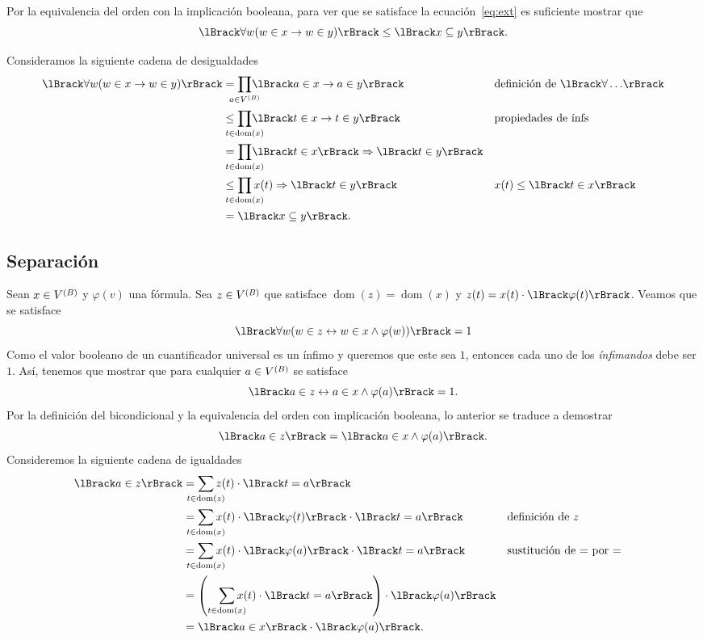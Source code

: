 \documentclass[letterpaper,DIV=15,12pt]{scrartcl}
\theoremstyle{manual}
\DeclarePairedDelimiter{\vb}{\lBrack}{\rBrack}             %
\DeclareMathOperator{\dom}{dom}                            %
\begin{document}
Por la equivalencia del orden con la implicación booleana, para ver que se
satisface la ecuación~\ref{eq:ext} es suficiente mostrar que
\begin{equation}
  \vb{\forall w(w\in x\to w\in y)}\leq\vb{x\subseteq y}.
\end{equation}

Consideramos la siguiente cadena de desigualdades
\begin{align*}
  \vb{\forall w(w\in x\to w\in y)} 
  &= \smashoperator{\prod_{a\in\mb}}\vb{a\in x\to a\in y}
  && \text{definición de \(\vb{\forall\dots}\)}\\
  &\leq \smashoperator{\prod_{t\in\dom(x)}}\vb{t\in x\to t\in y}
  && \text{propiedades de ínfs}\\
  &= \smashoperator{\prod_{t\in\dom(x)}}\vb{t\in x}\Rightarrow \vb{t\in y}\\
  &\leq \smashoperator{\prod_{t\in\dom(x)}}x(t)\Rightarrow\vb{t\in y}
  && x(t)\leq\vb{t\in x}\\
  &= \vb{x\subseteq y}.
\end{align*}


\subsection{Separación}
Sean \(x\in\mb\) y \(\varphi(v)\) una fórmula. Sea \(z\in\mb\) que satisface
\(\dom(z)=\dom(x)\) y \(z(t)=x(t)\cdot\vb{\varphi(t)}\). Veamos que se satisface
\begin{equation*}
  \vb{\forall w(w\in z \leftrightarrow w\in x\land\varphi(w))}=1
\end{equation*}
Como el valor booleano de un cuantificador universal es un ínfimo y queremos que
este sea \(1\), entonces cada uno de los \textit{ínfimandos} debe ser \(1\).
Así, tenemos que mostrar que para cualquier \(a\in\mb\) se satisface
\begin{equation*}
  \vb{a\in z \leftrightarrow a\in x\land\varphi(a)}=1.
\end{equation*}
Por la definición del bicondicional y la equivalencia del orden con implicación
booleana, lo anterior se traduce a demostrar
\begin{equation*}
  \vb{a\in z}=\vb{a\in x\land\varphi(a)}.
\end{equation*}
Consideremos la siguiente cadena de igualdades
\begin{align*}
  \vb{a\in z} &= \smashoperator{\sum_{t\in\dom(z)}}z(t)\cdot\vb{t=a}\\
  &= \smashoperator{\sum_{t\in\dom(x)}}x(t)\cdot\vb{\varphi(t)}\cdot\vb{t=a}
  && \text{definición de \(z\)}\\
  &= \smashoperator{\sum_{t\in\dom(x)}}x(t)\cdot\vb{\varphi(a)}\cdot\vb{t=a}
  && \text{sustitución de = por =}\\
  &= \left(\smashoperator[r]{\sum_{t\in\dom(x)}}x(t)
  \cdot\vb{t=a}\right)\cdot\vb{\varphi(a)}\\
  &= \vb{a\in x}\cdot\vb{\varphi(a)}.
\end{align*}
\end{document}
